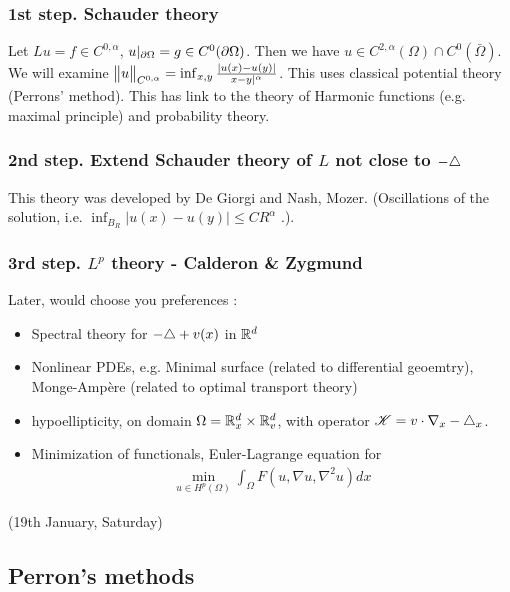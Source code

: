 \documentclass[12pt,a4paper]{article}
\renewenvironment{i}
{\begin{itemize} 
	}%
	{\end{itemize}
}
\begin{document}
\subsubsection*{1st step. Schauder theory}

Let $Lu = f \in C^{0, \alpha}$, $u|_{\partial \Omega}= g \in C^0(\partial \Omega)$. Then we have $u\in C^{2,\alpha}(\Omega) \cap C^0(\bar{\Omega})$. We will examine $\bigl\lVert u\bigr\rVert_{C^{0, \alpha}}= \inf_{x,y} \frac{|u(x)-u(y)|}{x-y|^{\alpha}}$. This uses classical potential theory (Perrons' method). This has link to the theory of Harmonic functions (e.g. maximal principle) and probability theory.

\subsubsection*{2nd step. Extend Schauder theory of $L$ not close to $-\triangle$}

This theory was developed by De Giorgi and Nash, Mozer. (Oscillations of the solution, i.e. $\inf_{B_R}|u(x)-u(y)| \leq CR^{\alpha}$ .).

\subsubsection*{3rd step. $L^p$ theory - Calderon \& Zygmund} 
\s

Later, would choose you preferences :
\begin{i}
\item Spectral theory for $-\triangle  + v(x)$ in $\mathbb{R}^d$

\item Nonlinear PDEs, e.g. Minimal surface (related to differential geoemtry), Monge-Amp\`{e}re (related to optimal transport theory)

\item hypoellipticity, on domain $\Omega = \mathbb{R}^d_x \times \mathbb{R}^d_v$, with operator $\mathscr{K} = v\cdot \nabla_x - \triangle_x$. 

\item Minimization of functionals, Euler-Lagrange equation for
\begin{align*}
\min_{u\in H^p(\Omega)} \int_{\Omega} F(u, \nabla u, \nabla^2 u) dx
\end{align*}
\end{i}
\s

\newday

(19th January, Saturday)
\s

\subsection*{Perron's methods}
\end{document}
